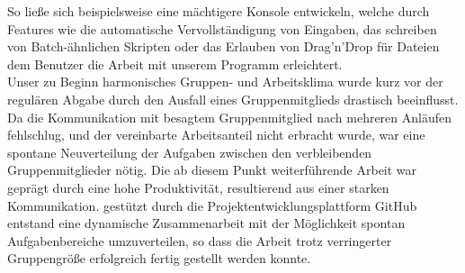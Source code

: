 So ließe sich beispielsweise eine mächtigere Konsole entwickeln, welche durch Features wie die automatische Vervollständigung von Eingaben, das schreiben von Batch-ähnlichen Skripten oder das Erlauben von Drag’n’Drop für Dateien dem Benutzer die Arbeit mit unserem Programm erleichtert.\\ 
Unser zu Beginn harmonisches Gruppen- und Arbeitsklima wurde kurz vor der regulären Abgabe durch den Ausfall eines Gruppenmitglieds drastisch beeinflusst. Da die Kommunikation mit besagtem Gruppenmitglied nach mehreren Anläufen fehlschlug, und der vereinbarte Arbeitsanteil nicht erbracht wurde, war eine spontane Neuverteilung der Aufgaben zwischen den verbleibenden Gruppenmitglieder nötig. 
Die ab diesem Punkt weiterführende Arbeit war geprägt durch eine hohe Produktivität, resultierend aus einer starken Kommunikation.
gestützt durch die Projektentwicklungsplattform GitHub entstand eine dynamische Zusammenarbeit mit der Möglichkeit spontan Aufgabenbereiche umzuverteilen, so dass die Arbeit trotz verringerter Gruppengröße erfolgreich fertig gestellt werden konnte.
%
